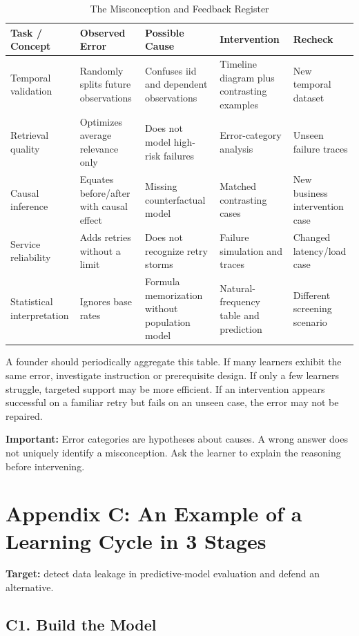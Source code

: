 \begin{table}[t]
\centering
\small
\caption{The Misconception and Feedback Register}
\begin{tabularx}{\textwidth}{p{}p{}p{}p{}X}
\toprule
\textbf{Task / Concept} & \textbf{Observed Error} & \textbf{Possible Cause} & \textbf{Intervention} & \textbf{Recheck} \\
\midrule
Temporal validation & Randomly splits future observations & Confuses iid and dependent observations & Timeline diagram plus contrasting examples & New temporal dataset \\
Retrieval quality & Optimizes average relevance only & Does not model high-risk failures & Error-category analysis & Unseen failure traces \\
Causal inference & Equates before/after with causal effect & Missing counterfactual model & Matched contrasting cases & New business intervention case \\
Service reliability & Adds retries without a limit & Does not recognize retry storms & Failure simulation and traces & Changed latency/load case \\
Statistical interpretation & Ignores base rates & Formula memorization without population model & Natural-frequency table and prediction & Different screening scenario \\
\bottomrule
\end{tabularx}
\end{table}

A founder should periodically aggregate this table. If many learners exhibit the same error, investigate instruction or prerequisite design. If only a few learners struggle, targeted support may be more efficient. If an intervention appears successful on a familiar retry but fails on an unseen case, the error may not be repaired.

\textbf{Important:} Error categories are hypotheses about causes. A wrong answer does not uniquely identify a misconception. Ask the learner to explain the reasoning before intervening.

\section*{Appendix C: An Example of a Learning Cycle in 3 Stages}

\textbf{Target:} detect data leakage in predictive-model evaluation and defend an alternative.

\subsection*{C1. Build the Model}

